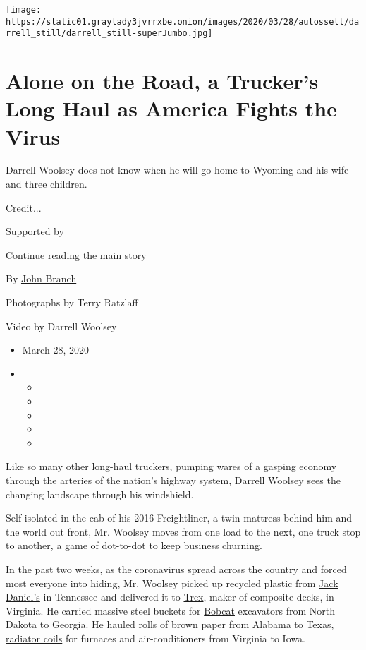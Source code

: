 \texttt{[image: https://static01.graylady3jvrrxbe.onion/images/2020/03/28/autossell/darrell\_still/darrell\_still-superJumbo.jpg]}

\hypertarget{alone-on-the-road-a-truckers-long-haul-as-america-fights-the-virus}{%
\section{Alone on the Road, a Trucker's Long Haul as America Fights the
Virus}\label{alone-on-the-road-a-truckers-long-haul-as-america-fights-the-virus}}

Darrell Woolsey does not know when he will go home to Wyoming and his
wife and three children.

Credit...

Supported by

\protect\hyperlink{after-sponsor}{Continue reading the main story}

By \href{https://www.nytimes3xbfgragh.onion/by/john-branch}{John Branch}

Photographs by Terry Ratzlaff

Video by Darrell Woolsey

\begin{itemize}
\item
  March 28, 2020
\item
  \begin{itemize}
  \item
  \item
  \item
  \item
  \item
  \end{itemize}
\end{itemize}

Like so many other long-haul truckers, pumping wares of a gasping
economy through the arteries of the nation's highway system, Darrell
Woolsey sees the changing landscape through his windshield.

Self-isolated in the cab of his 2016 Freightliner, a twin mattress
behind him and the world out front, Mr. Woolsey moves from one load to
the next, one truck stop to another, a game of dot-to-dot to keep
business churning.

In the past two weeks, as the coronavirus spread across the country and
forced most everyone into hiding, Mr. Woolsey picked up recycled plastic
from \href{https://www.jackdaniels.com/en-us/visit-us}{Jack Daniel's} in
Tennessee and delivered it to
\href{https://www.trex.com/our-company/}{Trex}, maker of composite
decks, in Virginia. He carried massive steel buckets for
\href{https://www.bobcat.com/index}{Bobcat} excavators from North Dakota
to Georgia. He hauled rolls of brown paper from Alabama to Texas,
\href{https://superradiatorcoils.com/our-company}{radiator coils} for
furnaces and air-conditioners from Virginia to Iowa.

